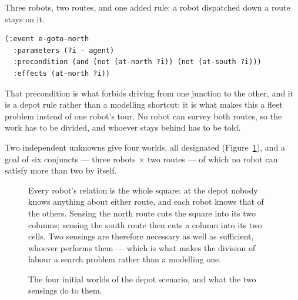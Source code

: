 \documentclass[11pt,a4paper]{article}
\newcommand{\blocked}{\mathit{blocked}}
\begin{document}
Three robots, two routes, and one added rule: a robot dispatched down a route
stays on it.

\begin{lstlisting}
(:event e-goto-north
  :parameters (?i - agent)
  :precondition (and (not (at-north ?i)) (not (at-south ?i)))
  :effects (at-north ?i))
\end{lstlisting}

\noindent
That precondition is what forbids driving from one junction to the other, and it
is a depot rule rather than a modelling shortcut: it is what makes this a fleet
problem instead of one robot's tour. No robot can survey both routes, so the
work has to be divided, and whoever stays behind has to be told.

Two independent unknowns give four worlds, all designated
(Figure~\ref{fig:depot-worlds}), and a goal of six conjuncts --- three robots
$\times$ two routes --- of which no robot can satisfy more than two by itself.

\begin{figure}[H]
\centering
\begin{minipage}{0.46\textwidth}
\centering
{}
\end{minipage}\hfill
\begin{minipage}{0.5\textwidth}
\small
Every robot's relation is the whole square: at the depot nobody knows anything
about either route, and each robot knows that of the others. Sensing the north
route cuts the square into its two columns; sensing the south route then cuts a
column into its two cells. Two sensings are therefore necessary as well as
sufficient, whoever performs them --- which is what makes the division of
labour a search problem rather than a modelling one.
\end{minipage}
\caption{The four initial worlds of the depot scenario, and what the two
sensings do to them.}
\label{fig:depot-worlds}
\end{figure}
\end{document}
